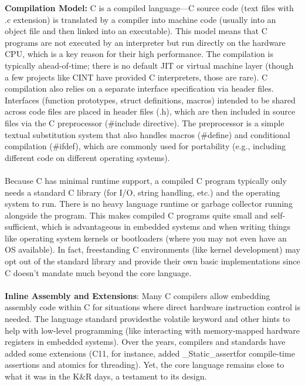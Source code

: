 \documentclass{article}
\begin{document}
{\normalsize \textbf{Compilation Model}}{\normalsize \textbf{:}} {\normalsize C is a compiled language—C source code (text files with .c extension) is translated by a compiler into machine code (us}{\normalsize ually into an object file and then linked into an executable). This model means that C programs are not executed by an interpreter but run directly on the hardware CPU, which is a key reason for their high performance. The compilation is typically ahead-of}{\normalsize -time; there is no default JIT or virtual machine layer (though a few projects like CINT have provided C interpreters, those are rare). C compilation also relies on a separate interface specification via header files. Interfaces (function prototypes, struc}{\normalsize t definitions, macros) intended to be shared across code files are placed in header files (.h), which are then included in source files via the C preprocessor (\#include directive). The preprocessor is a simple textual substitution system that also handles }{\normalsize macros (\#define) and conditional compilation (\#ifdef), which are commonly used for portability (e.g., including different code on different operating systems).}\\
\\
{\normalsize Because C has minimal runtime support, a compiled C program typically only needs a standard C l}{\normalsize ibrary (for I/O, string handling, etc.) and the operating system to run. There is no heavy language runtime or garbage collector running alongside the program. This makes compiled C programs quite small and self-sufficient, which is advantageous in embedde}{\normalsize d systems and when writing things like operating system kernels or bootloaders (where you may not even have an OS available). In fact, freestanding C environments (like kernel development) may opt out of the standard library and provide their own basic imp}{\normalsize lementations since C doesn't mandate much beyond the core language.}\\
\\
{\normalsize \textbf{Inline Assembly and Extensions}}: {\normalsize Many C compilers allow embedding assembly code within C for situations where direct hardware instruction control is needed. The language standard provides}{\normalsize  the volatile keyword and other hints to help with low-level programming (like interacting with memory-mapped hardware registers in embedded systems). Over the years, compilers and standards have added some extensions (C11, for instance, added \_}{\normalsize Static\_asse}{\normalsize rt}{\normalsize  for compile-time assertions and atomics for threading). Yet, the core language remains close to what it was in the K\&R days, a testament to its design.}\\
\end{document}
